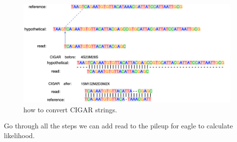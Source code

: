 \vspace{1cm}
\begin{figure}[H]
    \centering
    \includegraphics[width=1\columnwidth]{body/image/3-11.png}
    \captionsetup{labelfont=bf}
    \renewcommand{\baselinestretch}{1.0}
    \vspace{-1cm}
    \caption[CIGAR strings]{ how to convert CIGAR strings.}
    \label{f3-11}
\end{figure}

Go through all the steps we can add read to the pileup for eagle to calculate likelihood.